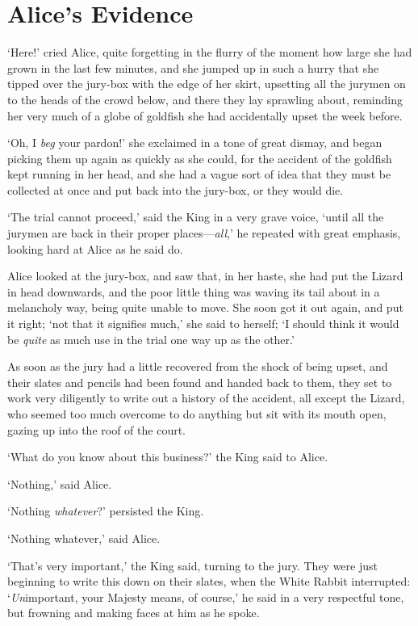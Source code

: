 \documentclass[12pt,openany]{memoir}
\begin{document}
\chapter{Alice's Evidence}

`Here!' cried Alice, quite forgetting in the flurry of the moment how large she had grown in the last few minutes, and she jumped up in such a hurry that she tipped over the jury-box with the edge of her skirt, upsetting all the jurymen on to the heads of the crowd below, and there they lay sprawling about, reminding her very much of a globe of goldfish she had accidentally upset the week before.

`Oh, I \textit{beg} your pardon!' she exclaimed in a tone of great dismay, and began picking them up again as quickly as she could, for the accident of the goldfish kept running in her head, and she had a vague sort of idea that they must be collected at once and put back into the jury-box, or they would die.

`The trial cannot proceed,' said the King in a very grave voice, `until all the jurymen are back in their proper places---\textit{all},' he repeated with great emphasis, looking hard at Alice as he said do.

Alice looked at the jury-box, and saw that, in her haste, she had put the Lizard in head downwards, and the poor little thing was waving its tail about in a melancholy way, being quite unable to move. She soon got it out again, and put it right; `not that it signifies much,' she said to herself; `I should think it would be \textit{quite} as much use in the trial one way up as the other.'

As soon as the jury had a little recovered from the shock of being upset, and their slates and pencils had been found and handed back to them, they set to work very diligently to write out a history of the accident, all except the Lizard, who seemed too much overcome to do anything but sit with its mouth open, gazing up into the roof of the court.

`What do you know about this business?' the King said to Alice.

`Nothing,' said Alice.

`Nothing \textit{whatever}?' persisted the King.

`Nothing whatever,' said Alice.

`That's very important,' the King said, turning to the jury. They were just beginning to write this down on their slates, when the White Rabbit interrupted: `\textit{Un}important, your Majesty means, of course,' he said in a very respectful tone, but frowning and making faces at him as he spoke.
\end{document}
